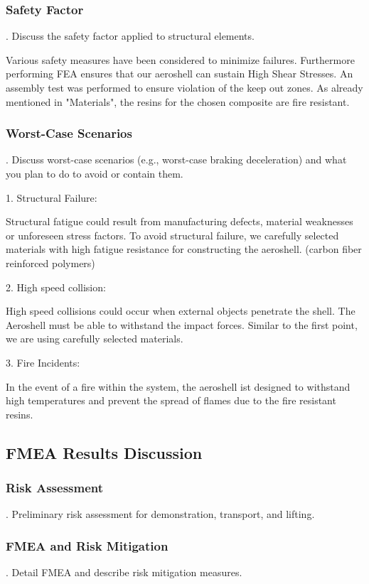 \subsubsection{Safety Factor}
.  Discuss the safety factor applied to structural elements.
\par %
Various safety measures have been considered to minimize failures. Furthermore performing FEA ensures that our aeroshell can sustain High Shear Stresses. An assembly test was performed to ensure violation of the keep out zones. As already mentioned in "Materials", the resins for the chosen composite are fire resistant.
\par %
\subsubsection{Worst-Case Scenarios}
.  Discuss worst-case scenarios (e.g., worst-case braking deceleration) and what you plan to do to avoid or contain them.
\par %
1. Structural Failure: 
\par %
Structural fatigue could result from manufacturing defects, material weaknesses or unforeseen stress factors. To avoid structural failure, we carefully selected materials with high fatigue resistance for constructing the aeroshell. (carbon fiber reinforced polymers)
\par %
2. High speed collision:
\par %
High speed collisions could occur when external objects penetrate the shell. The Aeroshell must be able to withstand the impact forces. Similar to the first point, we are using carefully selected materials.
\par %
3. Fire Incidents:
\par %
In the event of a fire within the system, the aeroshell ist designed to withstand high temperatures and prevent the spread of flames due to the fire resistant resins.
\par %
\subsection{FMEA Results Discussion}
\subsubsection{Risk Assessment}
.  Preliminary risk assessment for demonstration, transport, and lifting.
\subsubsection{FMEA and Risk Mitigation}
.  Detail FMEA and describe risk mitigation measures.
